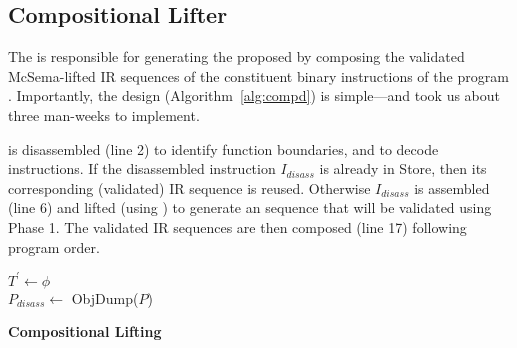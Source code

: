 \subsection{Compositional Lifter}\label{sec:compd}
The \compd is responsible for generating the proposed \LLVM {} by
composing the validated McSema-lifted IR sequences of the constituent binary
instructions of the \ISA program . Importantly, the \compd design 
(Algorithm~\ref{alg:compd}) is simple---and took us about 
three man-weeks to implement. 

 is disassembled (line 2) to
identify function boundaries, and to decode 
instructions.
If the disassembled instruction $I_{disass}$ is already in Store, then its
corresponding (validated) IR sequence is reused.
Otherwise $I_{disass}$
is assembled (line 6) and lifted (using \mcsema) to
generate an \LLVM sequence that will be validated using Phase 1. The validated IR 
sequences are then composed (line 17) following program order.

\begin{algorithm}
    \BlankLine
    $T^\prime \gets \phi$ \\
    $P_{disass} \gets$ ObjDump($P$) \\
    \caption{\textbf{Compositional Lifting}}\label{alg:compd}
\end{algorithm}

